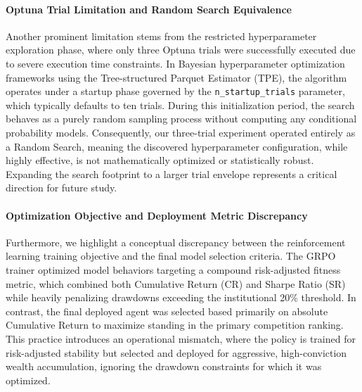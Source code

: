     \paragraph{Optuna Trial Limitation and Random Search Equivalence}
    Another prominent limitation stems from the restricted hyperparameter exploration phase, where only three Optuna trials were successfully executed due to severe execution time constraints. In Bayesian hyperparameter optimization frameworks using the Tree-structured Parquet Estimator (TPE), the algorithm operates under a startup phase governed by the \texttt{n\_startup\_trials} parameter, which typically defaults to ten trials. During this initialization period, the search behaves as a purely random sampling process without computing any conditional probability models. Consequently, our three-trial experiment operated entirely as a Random Search, meaning the discovered hyperparameter configuration, while highly effective, is not mathematically optimized or statistically robust. Expanding the search footprint to a larger trial envelope represents a critical direction for future study.

    \paragraph{Optimization Objective and Deployment Metric Discrepancy}
    Furthermore, we highlight a conceptual discrepancy between the reinforcement learning training objective and the final model selection criteria. The GRPO trainer optimized model behaviors targeting a compound risk-adjusted fitness metric, which combined both Cumulative Return (CR) and Sharpe Ratio (SR) while heavily penalizing drawdowns exceeding the institutional 20\% threshold. In contrast, the final deployed agent was selected based primarily on absolute Cumulative Return to maximize standing in the primary competition ranking. This practice introduces an operational mismatch, where the policy is trained for risk-adjusted stability but selected and deployed for aggressive, high-conviction wealth accumulation, ignoring the drawdown constraints for which it was optimized.




